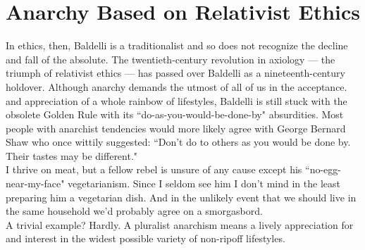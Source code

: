\section*{Anarchy Based on Relativist Ethics}
In ethics, then, Baldelli is a traditionalist and so does not recognize the decline and fall of the absolute. The twentieth-century revolution in axiology --- the triumph of relativist ethics --- has passed over Baldelli as a nineteenth-century holdover. Although anarchy demands the utmost of all of us in the acceptance. and appreciation of a whole rainbow of lifestyles, Baldelli is still stuck with the obsolete Golden Rule with its ``do-as-you-would-be-done-by" absurdities. Most people with anarchist tendencies would more likely agree with George Bernard Shaw who once wittily suggested: ``Don't do to others as you would be done by. Their tastes may be different."\\
I thrive on meat, but a fellow rebel is unsure of any cause except his ``no-egg-near-my-face" vegetarianism. Since I seldom see him I don't mind in the least preparing him a vegetarian dish. And in the unlikely event that we should live in the same household we'd probably agree on a smorgasbord.\\
A trivial example? Hardly. A pluralist anarchism means a lively appreciation for and interest in the widest possible variety of non-ripoff lifestyles.

